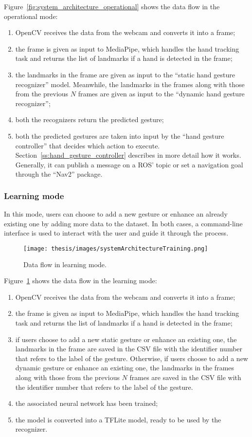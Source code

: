 \documentclass[../thesis.tex]{subfiles}
\begin{document}
Figure~\ref{fig:system_architecture_operational} shows the data flow in the operational mode:
\begin{enumerate}
    \item OpenCV receives the data from the webcam and converts it into a frame;
    \item the frame is given as input to MediaPipe, which handles the hand tracking task and returns the list of landmarks if a hand is detected in the frame;
    \item the landmarks in the frame are given as input to the ``static hand gesture recognizer'' model. Meanwhile, the landmarks in the frames along with those from the previous $N$ frames are given as input to the ``dynamic hand gesture recognizer'';
    \item both the recognizers return the predicted gesture;
    \item both the predicted gestures are taken into input by the ``hand gesture controller'' that decides which action to execute. Section~\ref{ss:hand_gesture_controller} describes in more detail how it works. Generally, it can publish a message on a \acrshort{ROS}' topic or set a navigation goal through the ``Nav2'' package.
\end{enumerate}

\subsubsection{Learning mode}
In this mode, users can choose to add a new gesture or enhance an already existing one by adding more data to the dataset. In both cases, a command-line interface is used to interact with the user and guide it through the process.
\begin{figure}[H]
    \centering
    \texttt{[image: thesis/images/systemArchitectureTraining.png]}
    \caption{Data flow in learning mode.}
    \label{fig:system_architecture_learning}
\end{figure}
Figure~\ref{fig:system_architecture_learning} shows the data flow in the learning mode:
\begin{enumerate}
    \item OpenCV receives the data from the webcam and converts it into a frame;
    \item the frame is given as input to MediaPipe, which handles the hand tracking task and returns the list of landmarks if a hand is detected in the frame;
    \item if users choose to add a new static gesture or enhance an existing one, the landmarks in the frame are saved in the CSV file with the identifier number that refers to the label of the gesture. Otherwise, if users choose to add a new dynamic gesture or enhance an existing one, the landmarks in the frames along with those from the previous $N$ frames are saved in the CSV file with the identifier number that refers to the label of the gesture.
    \item the associated neural network has been trained;
    \item the model is converted into a TFLite model, ready to be used by the recognizer.
\end{enumerate}
\end{document}
